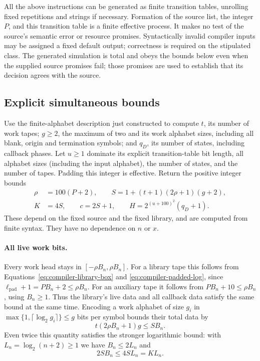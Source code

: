 All the above instructions can be generated as finite transition tables,
unrolling fixed repetitions and strings if necessary.  Formation of the
source list, the integer $P$, and this transition table is a finite
effective process.  It makes no test of the source's semantic error or
resource promises.  Syntactically invalid compiler inputs may be assigned
a fixed default output; correctness is required on the stipulated class.
The generated simulation is total and obeys the bounds below even when
the supplied source promises fail; those promises are used to establish
that its decision agrees with the source.

\subsection{Explicit simultaneous bounds}
\label{subsec:compiler-bounds}

Use the finite-alphabet description just constructed to compute $t$, its
number of work tapes; $g\ge2$, the maximum of two and its work alphabet
sizes, including all blank, origin and termination symbols; and $q_D$,
its number of states, including callback phases.  Let $u\ge1$ dominate
its explicit transition-table bit length, all alphabet sizes (including
the input alphabet), the number of states, and the number of tapes.
Padding this integer is effective.  Return the positive integer bounds
\begin{equation}\label{eq:compiler-output-bounds}
 \begin{split}
 \rho&=100(P+2),\qquad
 S=1+(t+1)(2\rho+1)(g+2),\\
 K&=4S,\qquad c=2S+1,\qquad
 H=2^{(u+100)^2}(q_D+1).
 \end{split}
\end{equation}
These depend on the fixed source and the fixed library, and are computed
from finite syntax.  They have no dependence on $n$ or $x$.

\paragraph{All live work bits.}
Every work head stays in
$[-\rho B_n,\rho B_n]$.  For a library tape this follows from
Equations~\eqref{eq:compiler-library-box} and
\eqref{eq:compiler-padded-log}, since
$\ell_{\mathrm{pad}}+1=PB_n+2\le\rho B_n$.
For an auxiliary tape it follows from
$PB_n+10\le\rho B_n$, using $B_n\ge1$.
Thus the library's live data and all callback data satisfy the same
bound at the same time.  Encoding a work alphabet of size $g_i$ in
$\max\{1,\lceil\log_2 g_i\rceil\}\le g$ bits per symbol bounds
their total data by
\begin{equation}\label{eq:compiler-space-bound}
 t(2\rho B_n+1)g\le SB_n.
\end{equation}
Even twice this quantity satisfies the stronger logarithmic bound: with
$L_n=\log_2(n+2)\ge1$ we have $B_n\le2L_n$ and
\[
 2SB_n\le4SL_n=K L_n.
\]

